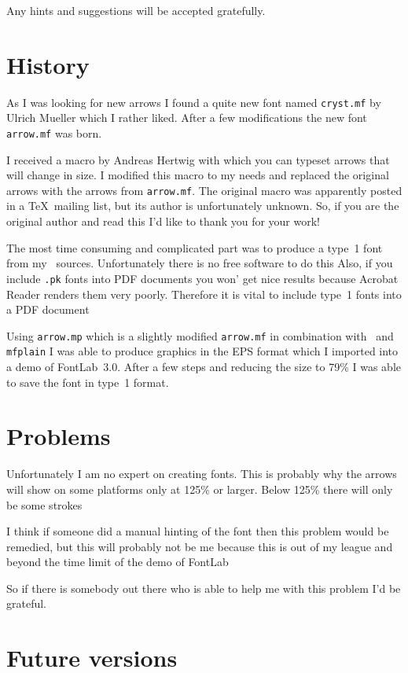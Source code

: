 \documentclass[DIV=9, pagesize=auto]{scrartcl}
\begin{document}
Any hints and suggestions will be accepted gratefully.


\section{History}

As I was looking for new arrows I found a quite new font named \texttt{cryst.mf} by 
Ulrich Mueller which I rather liked. After a few modifications the new font 
\texttt{arrow.mf} was born.

I received a macro by Andreas Hertwig with which you can typeset arrows 
that will change in size. I modified this macro to my needs and replaced the 
original arrows with the arrows from \texttt{arrow.mf}. The original macro was apparently 
posted in a \TeX\ mailing list, but its author is unfortunately unknown. So, if 
you are the original author and read this I'd like to thank you for your work!

The most time consuming and complicated part was to produce a type~1 font 
from my \MF\ sources. Unfortunately there is no free software to do 
this \frownie
Also, if you include \texttt{.pk} fonts into PDF documents you won' get nice results 
because Acrobat Reader renders them very poorly. Therefore it is vital to 
include type~1 fonts into a PDF document \frownie

Using \texttt{arrow.mp} which is a slightly modified \texttt{arrow.mf} in combination with 
\MP\ and \texttt{mfplain} I was able to produce graphics in the EPS format which I 
imported into a demo of FontLab~3.0. After a few steps and reducing the 
size to 79\% I was able to save the font in type~1 format.


\section{Problems}

Unfortunately I am no expert on creating fonts. This is probably why the 
arrows will show on some platforms only at 125\% or larger. Below 125\% there 
will only be some strokes \frownie

I think if someone did a manual hinting of the font then this problem 
would be remedied, but this will probably not be me because this is out of 
my league and beyond the time limit of the demo of FontLab \smiley

So if there is somebody out there who is able to help me with this problem 
I'd be grateful.


\section{Future versions}
\end{document}
